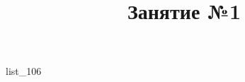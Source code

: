 \documentclass[12pt, a4paper]{article}
\begin{document}
	\title{Занятие №1}
	{list_106}
\end{document}

